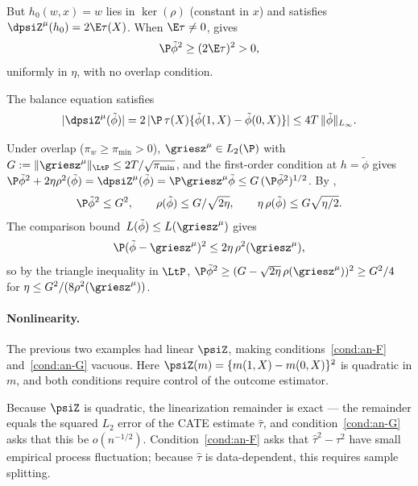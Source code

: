 \documentclass{article}
\begin{document}
But $h_0(w,x) = w$
lies in $\ker(\rho)$
(constant in $x$)
and satisfies $\dpsiZ^\mu(h_0) = 2\E\tau(X)$.
When $\E\tau \ne 0$,
 gives
\begin{equation}\label{eq:vcate-denominator-anchor}
\P\tilde\phi^2
  \ge (2\E\tau)^2 > 0,
\end{equation}
uniformly in $\eta$,
with no overlap condition.

The balance equation satisfies
\begin{equation}\label{eq:vcate-balance}
|\dpsiZ^\mu(\tilde\phi)|
  = 2\,|\P\,\tau(X)\{\tilde\phi(1,X) - \tilde\phi(0,X)\}|
  \le 4T\,\|\tilde\phi\|_{L_\infty}.
\end{equation}

Under overlap ($\pi_w \ge \pi_{\min} > 0$),
$\griesz^\mu \in L_2(\P)$
with $G := \|\griesz^\mu\|_{\LtP}
  \le 2T/\sqrt{\pi_{\min}}$,
and the first-order condition
at $h = \tilde\phi$ gives
$\P\tilde\phi^2 + 2\eta\rho^2(\tilde\phi)
  = \dpsiZ^\mu(\tilde\phi)
  = \P\griesz^\mu \tilde\phi
  \le G\,(\P\tilde\phi^2)^{1/2}$.
By ,
\begin{equation}\label{eq:vcate-balance-bounds}
\P\tilde\phi^2 \le G^2,
\qquad
\rho(\tilde\phi) \le G/\sqrt{2\eta},
\qquad
\eta\,\rho(\tilde\phi) \le G\sqrt{\eta/2}.
\end{equation}
The comparison bound~$L(\tilde\phi) \le L(\griesz^\mu)$
gives
\begin{equation}\label{eq:vcate-lower-anchor}
\P(\tilde\phi - \griesz^\mu)^2
  \le 2\eta\,\rho^2(\griesz^\mu),
\end{equation}
so by the triangle inequality in $\LtP$,
$\P\tilde\phi^2
  \ge (G
    - \sqrt{2\eta}\,\rho(\griesz^\mu))^2
  \ge G^2/4$
for $\eta \le G^2/(8\rho^2(\griesz^\mu))$.

\paragraph{Nonlinearity.}
The previous two examples had linear $\psiZ$,
making conditions~\ref{cond:an-F} and~\ref{cond:an-G} vacuous.
Here $\psiZ(m) = \{m(1,X) - m(0,X)\}^2$
is quadratic in $m$,
and both conditions require control of the outcome estimator.

Because $\psiZ$ is quadratic,
the linearization remainder is exact ---
the remainder equals the squared $L_2$ error
of the CATE estimate $\hat\tau$,
and condition~\ref{cond:an-G} asks that this be $o(n^{-1/2})$.
Condition~\ref{cond:an-F} asks that $\hat\tau^2 - \tau^2$
have small empirical process fluctuation;
because $\hat\tau$ is data-dependent,
this requires sample splitting.
\end{document}
